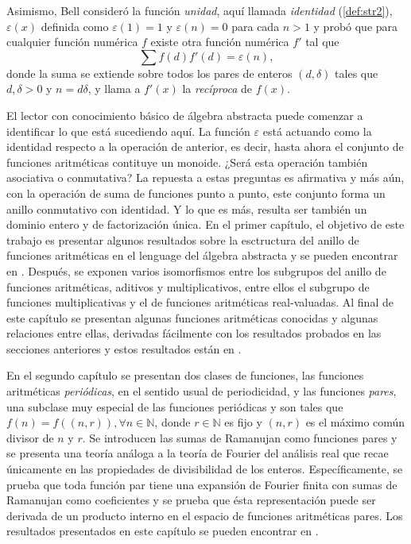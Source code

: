 Asimismo, Bell consideró la función \textit{unidad}, aquí llamada \emph{identidad} (\cref{def:str2}), $\varepsilon(x)$ definida como $\varepsilon(1)=1$ y $\varepsilon(n)=0$ para cada $n>1$ y probó que para cualquier función numérica $f$ existe otra función numérica $f'$ tal que
\begin{equation*}
    \sum f(d) f'(d) = \varepsilon(n) \tag{$n=1,2,3,\ldots$},
\end{equation*}
donde la suma se extiende sobre todos los pares de enteros $(d,\delta)$ tales que $d,\delta >0$ y $n = d \delta$, y llama a $f'(x)$ la \textit{recíproca} de $f(x)$.
\bigskip

El lector con conocimiento básico de álgebra abstracta puede comenzar a identificar lo que está sucediendo aquí. La función $\varepsilon$ está actuando como la identidad respecto a la operación de anterior, es decir, hasta ahora el conjunto de funciones aritméticas contituye un monoide. ¿Será esta operación también asociativa o conmutativa? La repuesta a estas preguntas es afirmativa y más aún, con la operación de suma de funciones punto a punto, este conjunto forma un anillo conmutativo con identidad. Y lo que es más, resulta ser también un dominio entero y de factorización única. En el primer capítulo, el objetivo de este trabajo es presentar algunos resultados sobre la esctructura del anillo de funciones aritméticas en el lenguage del álgebra abstracta y se pueden encontrar en \cite{Ca1959, Nish1, Bell1}. Después, se exponen varios isomorfismos entre los subgrupos del anillo de funciones aritméticas, aditivos y multiplicativos, entre ellos el subgrupo de funciones multiplicativas y el de funciones aritméticas real-valuadas. Al final de este capítulo se presentan algunas funciones aritméticas conocidas y algunas relaciones entre ellas, derivadas fácilmente con los resultados probados en las secciones anteriores y estos resultados están en \cite{Rea1}.
\bigskip

En el segundo capítulo se presentan dos clases de funciones, las funciones aritméticas \emph{periódicas}, en el sentido usual de periodicidad, y las funciones \emph{pares}, una subclase muy especial de las funciones periódicas y son tales que $f(n)=f((n,r)), \forall n \in \mathbb{N}$, donde $r \in \mathbb{N}$ es fijo y $(n,r)$ es el máximo común divisor de $n$ y $r$. Se introducen las sumas de Ramanujan como funciones pares y se presenta una teoría análoga a la teoría de Fourier del análisis real que recae únicamente en las propiedades de divisibilidad de los enteros. Específicamente, se prueba que toda función par tiene una expansión de Fourier finita con sumas de Ramanujan como coeficientes y se prueba que ésta representación puede ser derivada de un producto interno en el espacio de funciones aritméticas pares. Los resultados presentados en este capítulo se pueden encontrar en \cite{Coh1, Knopf1, Knopf2, Murty1}.
\bigskip

